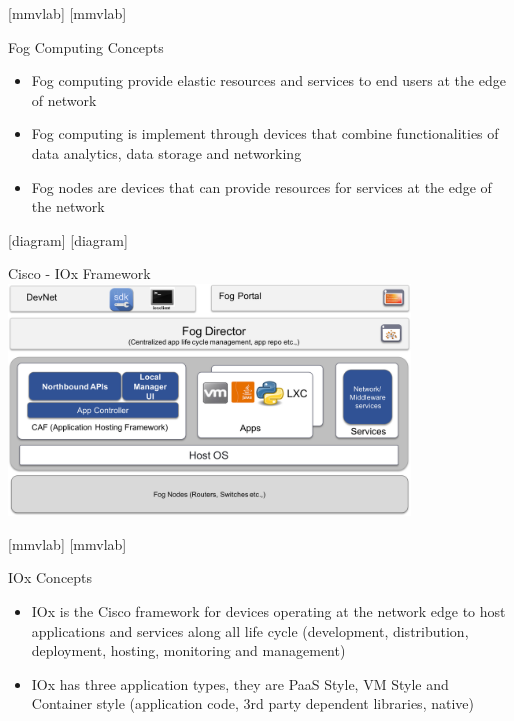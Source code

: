 \documentclass{beamer}
\begin{document}
[mmvlab]
[mmvlab]

\begin{frame}{Fog Computing Concepts}
\begin{itemize}
\item Fog computing provide elastic resources and services to end users at the edge of network
\item Fog computing is implement through devices that combine functionalities of data analytics, data storage and networking
\item Fog nodes are devices that can provide resources for services at the edge of the network
\end{itemize}
\end{frame}


[diagram]
[diagram]

\begin{frame}{Cisco - IOx Framework}
\centering
\includegraphics[width=0.8\textwidth]{images/iox}
\end{frame}

[mmvlab]
[mmvlab]

\begin{frame}{IOx Concepts}
\begin{itemize}
\item IOx is the Cisco framework for devices operating at the network edge to host applications and services along all life cycle (development, distribution, deployment, hosting, monitoring and management)
\item IOx has three application types, they are PaaS Style, VM Style and Container style (application code, 3rd party dependent libraries, native)
\end{itemize}
\end{frame}
\end{document}
